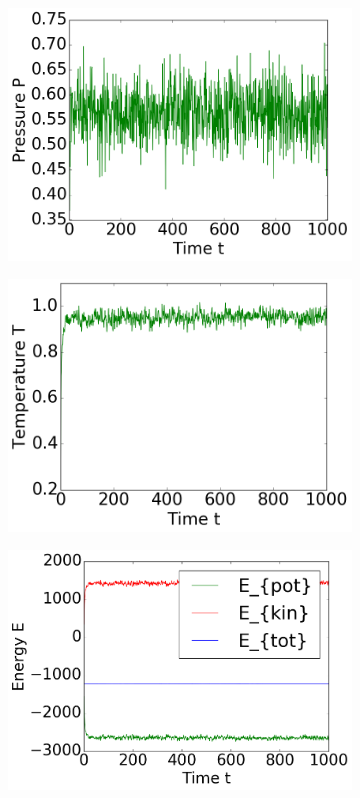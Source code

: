 \begin{figure}[ht]
\hfill
\begin{subfigure}{0.3\textwidth}
\includegraphics[width=\textwidth]{../dat/Pressure.png}
\end{subfigure}
\hfill
\begin{subfigure}{0.3\textwidth}
\includegraphics[width=\textwidth]{../dat/Temperature.png}
\end{subfigure}
\hfill
\begin{subfigure}{0.3\textwidth}
\includegraphics[width=\textwidth]{../dat/Energies.png}
\end{subfigure}
\end{figure}

